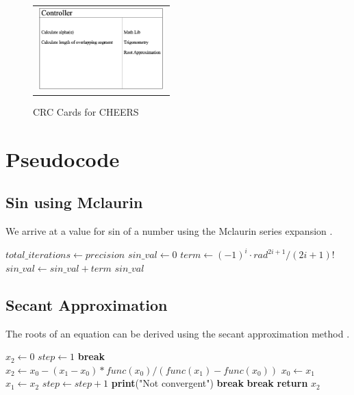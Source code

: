 \documentclass{report}
\begin{document}
\begin{figure}[h!]
      \begin{tabular}{@{}c@{}}
        \includegraphics[width=.4\linewidth,height=90pt]{resources/Controller.png}
      \end{tabular}

      \vspace{\floatsep}
    \caption{CRC Cards for CHEERS}\label{fig:myfig}
\end{figure}

\chapter{Pseudocode}
\section{Sin using Mclaurin}
\begin{flushleft}
We arrive at a value for sin of a number using the Mclaurin series expansion \cite{doi:10.1137/1021091}.
\end{flushleft}
\begin{algorithmic}[1]
        \State $total\_iterations \gets precision$
        \State $sin\_val \gets 0$
            \State $term \gets (-1)^i \cdot rad^{2i + 1} / (2i + 1)!$
            \State $sin\_val \gets sin\_val + term$
        \EndFor
        \State \Return $sin\_val$
    \EndFunction
\end{algorithmic}

\section{Secant Approximation}
\begin{flushleft}
The roots of an equation can be derived using the secant approximation method \cite{Wikipedia:SecantMethod}.
\end{flushleft}
\begin{algorithmic}[1]
    \State $x_2 \gets 0$
    \State $step \gets 1$
            \State \textbf{break}
        \EndIf
        \State $x_2 \gets x_0 - (x_1 - x_0) * func(x_0) / (func(x_1) - func(x_0))$
        \State $x_0 \gets x_1$
        \State $x_1 \gets x_2$
        \State $step \gets step + 1$
            \State \textbf{print}("Not convergent")
            \State \textbf{break}
        \EndIf
            \State \textbf{break}
        \EndIf
    \EndWhile
    \State \textbf{return} $x_2$
\EndFunction
\end{algorithmic}
\end{document}
